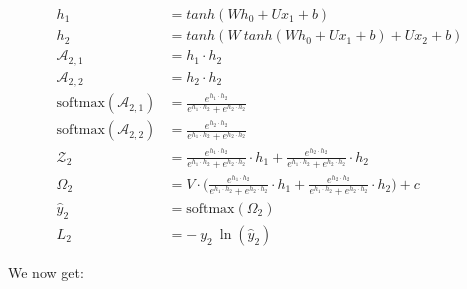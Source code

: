 \documentclass{article}
\begin{document}
\begin{align*}
h_1 &= tanh(W h_0 +Ux_1 +b)\\
	h_2 &= tanh(W~tanh(W h_0 +Ux_1 +b)+Ux_2 +b)\\
 \mathcal{A}_{2,1} &= h_1 \cdot h_2\\
 \mathcal{A}_{2,2} &=h_2 \cdot h_2 \\
\text{softmax}(\mathcal{A}_{2,1}) &= \frac{e^{h_1 \cdot h_2 }}{ e^{h_1 \cdot h_2}+e^{h_2 \cdot h_2}} \\
\text{softmax}(\mathcal{A}_{2,2}) &= \frac{e^{h_2 \cdot h_2 }}{ e^{h_1 \cdot h_2}+e^{h_2 \cdot h_2}}\\
\mathcal{Z}_2 &= \frac{e^{h_1 \cdot h_2 }}{ e^{h_1 \cdot h_2}+e^{h_2 \cdot h_2}} \cdot h_1 +\frac{e^{h_2 \cdot h_2 }}{ e^{h_1 \cdot h_2}+e^{h_2 \cdot h_2}} \cdot h_2\\
\Omega_2 &= V \cdot \bigg(\frac{e^{h_1 \cdot h_2 }}{ e^{h_1 \cdot h_2}+e^{h_2 \cdot h_2}} \cdot h_1 +\frac{e^{h_2 \cdot h_2 }}{ e^{h_1 \cdot h_2}+e^{h_2 \cdot h_2}} \cdot h_2 \bigg) + c\\
\hat{y}_2 &= \text{softmax}(\Omega_2)\\
        L_2 &= -~y_2~\ln{(\hat{y}_2)}
\end{align*}

We now get:
\end{document}
